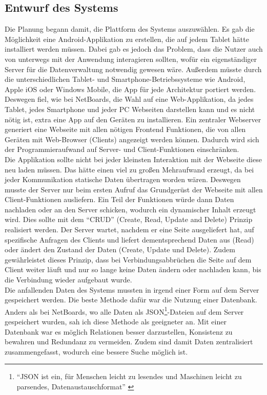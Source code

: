 \subsection{Entwurf des Systems}\label{Entwurf des Systems}
Die Planung begann damit, die Plattform des Systems auszuwählen.
Es gab die Möglichkeit eine Android-Applikation zu erstellen, die auf jedem Tablet hätte installiert werden müssen.
Dabei gab es jedoch das Problem, dass die Nutzer auch von unterwegs mit der Anwendung interagieren sollten, wofür ein eigenständiger Server für die Datenverwaltung notwendig gewesen wäre.
Außerdem müsste durch die unterschiedlichen Tablet- und Smartphone-Betriebssysteme wie Android, Apple iOS oder Windows Mobile, die App für jede Architektur portiert werden.
\\
Deswegen fiel, wie bei NetBoards, die Wahl auf eine Web-Applikation, da jedes Tablet, jedes Smartphone und jeder PC Webseiten darstellen kann und es nicht nötig ist, extra eine App auf den Geräten zu installieren.
Ein zentraler Webserver generiert eine Webseite mit allen nötigen Frontend Funktionen, die von allen Geräten mit Web-Browser (Clients) angezeigt werden können.
Dadurch wird sich der Programmieraufwand auf Server- und Client-Funktionen einschränken.
\\
Die Applikation sollte nicht bei jeder kleinsten Interaktion mit der Webseite diese neu laden müssen. Das hätte einen viel zu großen Mehraufwand erzeugt, da bei jeder Kommunikation statische Daten übertragen worden wären.
Deswegen musste der Server nur beim ersten Aufruf das Grundgerüst der Webseite mit allen Client-Funktionen ausliefern. Ein Teil der Funktionen würde dann Daten nachladen oder an den Server schicken, wodurch ein dynamischer Inhalt erzeugt wird.
Dies sollte mit dem ``CRUD'' (Create, Read, Update and Delete) Prinzip realisiert werden.
Der Server wartet, nachdem er eine Seite ausgeliefert hat, auf spezifische Anfragen des Clients und liefert dementsprechend Daten aus (Read) oder ändert den Zustand der Daten (Create, Update und Delete). Zudem gewährleistet dieses Prinzip, dass bei Verbindungsabbrüchen die Seite auf dem Client weiter läuft und nur so lange keine Daten ändern oder nachladen kann, bis die Verbindung wieder aufgebaut wurde.
\\
Die anfallenden Daten des Systems mussten in irgend einer Form auf dem Server gespeichert werden. Die beste Methode dafür war die Nutzung einer Datenbank. Anders als bei NetBoards, wo alle Daten als JSON\footnote{``JSON ist ein, für Menschen leicht zu lesendes und Maschinen leicht zu parsendes, Datenaustauschformat'' \cite{json:website}}-Dateien auf dem Server gespeichert wurden, sah ich diese Methode als geeigneter an. Mit einer Datenbank war es möglich Relationen besser darzustellen, Konsistenz zu bewahren und Redundanz zu vermeiden. Zudem sind damit Daten zentralisiert zusammengefasst, wodurch eine bessere Suche möglich ist.
